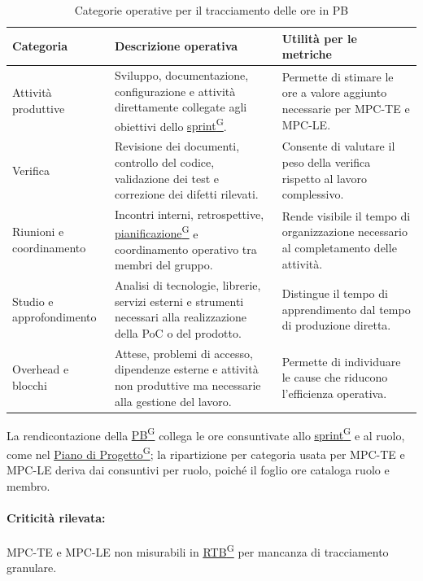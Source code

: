 \documentclass[a4paper,12pt]{article}
\providecommand{\glslink}[2]{\href{https://alittlebyte-19.github.io/Documentazione/glossario.html\#gls-#1}{\underline{#2}\textsuperscript{\scriptsize G}}}
\begin{document}
\begin{table}[H]
    \centering
    \renewcommand{\arraystretch}{1.25}
    \begin{tabularx}{\textwidth}{|p{3.1cm}|X|X|}
        \hline
        \rowcolor{gray!35}
        \textbf{Categoria} & \textbf{Descrizione operativa} & \textbf{Utilità per le metriche} \\
        \hline
        Attività produttive & Sviluppo, documentazione, configurazione e attività direttamente collegate agli obiettivi dello \glslink{sprint}{sprint}. & Permette di stimare le ore a valore aggiunto necessarie per MPC-TE e MPC-LE. \\
        \hline
        Verifica & Revisione dei documenti, controllo del codice, validazione dei test e correzione dei difetti rilevati. & Consente di valutare il peso della verifica rispetto al lavoro complessivo. \\
        \hline
        Riunioni e coordinamento & Incontri interni, retrospettive, \glslink{pianificazione}{pianificazione} e coordinamento operativo tra membri del gruppo. & Rende visibile il tempo di organizzazione necessario al completamento delle attività. \\
        \hline
        Studio e approfondimento & Analisi di tecnologie, librerie, servizi esterni e strumenti necessari alla realizzazione della PoC o del prodotto. & Distingue il tempo di apprendimento dal tempo di produzione diretta. \\
        \hline
        Overhead e blocchi & Attese, problemi di accesso, dipendenze esterne e attività non produttive ma necessarie alla gestione del lavoro. & Permette di individuare le cause che riducono l'efficienza operativa. \\
        \hline
    \end{tabularx}
    \caption{Categorie operative per il tracciamento delle ore in PB}
\end{table}

La rendicontazione della \glslink{pb-product-baseline}{PB} collega le ore consuntivate allo \glslink{sprint}{sprint} e al ruolo, come nel \glslink{piano-di-progetto}{Piano di Progetto}; la ripartizione per categoria usata per MPC-TE e MPC-LE deriva dai consuntivi per ruolo, poiché il foglio ore cataloga ruolo e membro.

\paragraph*{Criticità rilevata:} MPC-TE e MPC-LE non misurabili in \glslink{rtb-requirements-and-technology-baseline}{RTB} per mancanza di tracciamento granulare.
\end{document}
